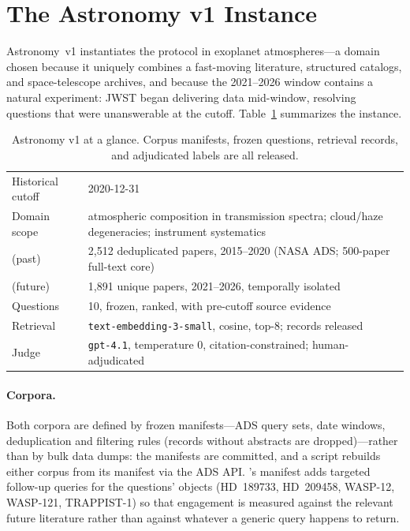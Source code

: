 \section{The Astronomy v1 Instance}
\label{sec:dataset}

Astronomy~v1 instantiates the protocol in exoplanet atmospheres---a
domain chosen because it uniquely combines a fast-moving literature,
structured catalogs, and space-telescope archives, and because the
2021--2026 window contains a natural experiment: JWST began delivering
data mid-window, resolving questions that were unanswerable at the
cutoff. Table~\ref{tab:corpus} summarizes the instance.

\begin{table}[t]
  \centering
  \small
  \caption{Astronomy v1 at a glance. Corpus manifests, frozen questions,
  retrieval records, and adjudicated labels are all released.}
  \label{tab:corpus}
  \begin{tabular}{@{}ll@{}}
    \toprule
    Historical cutoff & 2020-12-31 \\
    Domain scope & atmospheric composition in transmission spectra;
                   cloud/haze degeneracies; instrument systematics \\
    \midrule
    \corpusA{} (past) & 2{,}512 deduplicated papers, 2015--2020 (NASA ADS;
                        500-paper full-text core) \\
    \corpusB{} (future) & 1{,}891 unique papers, 2021--2026, temporally
                          isolated \\
    Questions & 10, frozen, ranked, with pre-cutoff source evidence \\
    Retrieval & \texttt{text-embedding-3-small}, cosine, top-8; records released \\
    Judge & \texttt{gpt-4.1}, temperature 0, citation-constrained;
            human-adjudicated \\
    \bottomrule
  \end{tabular}
\end{table}

\paragraph{Corpora.} Both corpora are defined by frozen manifests---ADS
query sets, date windows, deduplication and filtering rules
(records without abstracts are dropped)---rather than by bulk data
dumps: the manifests are committed, and a script rebuilds either corpus
from its manifest via the ADS API. \corpusB{}'s manifest adds targeted
follow-up queries for the questions' objects (HD~189733, HD~209458,
WASP-12, WASP-121, TRAPPIST-1) so that engagement is measured against
the relevant future literature rather than against whatever a generic
query happens to return.

